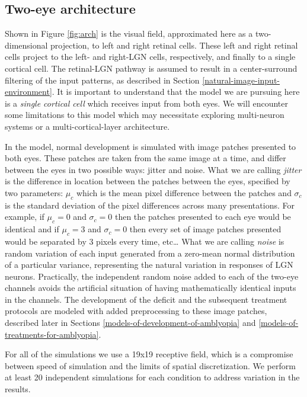 \documentclass[
  sn-apa,
  pdflatex]{sn-jnl}
\theoremstyle{thmstyleone}%
\theoremstyle{thmstyletwo}%
\theoremstyle{thmstylethree}%
\begin{document}
\hypertarget{two-eye-architecture}{%
\subsection{Two-eye architecture}\label{two-eye-architecture}}

Shown in Figure \ref{fig:arch} is the visual field, approximated here as
a two-dimensional projection, to left and right retinal cells. These
left and right retinal cells project to the left- and right-LGN cells,
respectively, and finally to a single cortical cell. The retinal-LGN
pathway is assumed to result in a center-surround filtering of the input
patterns, as described in Section \ref{natural-image-input-environment}.
It is important to understand that the model we are pursuing here is a
\emph{single cortical cell} which receives input from both eyes. We will
encounter some limitations to this model which may necessitate exploring
multi-neuron systems or a multi-cortical-layer architecture.

In the model, normal development is simulated with image patches
presented to both eyes. These patches are taken from the same image at a
time, and differ between the eyes in two possible ways: jitter and
noise. What we are calling \emph{jitter} is the difference in location
between the patches between the eyes, specified by two parameters:
\(\mu_c\) which is the mean pixel difference between the patches and
\(\sigma_c\) is the standard deviation of the pixel differences across
many presentations. For example, if \(\mu_c=0\) and \(\sigma_c=0\) then
the patches presented to each eye would be identical and if \(\mu_c=3\)
and \(\sigma_c=0\) then every set of image patches presented would be
separated by 3 pixels every time, etc\ldots{} What we are calling
\emph{noise} is random variation of each input generated from a
zero-mean normal distribution of a particular variance, representing the
natural variation in responses of LGN neurons. Practically, the
independent random noise added to each of the two-eye channels avoids
the artificial situation of having mathematically identical inputs in
the channels. The development of the deficit and the subsequent
treatment protocols are modeled with added preprocessing to these image
patches, described later in Sections
\ref{models-of-development-of-amblyopia} and
\ref{models-of-treatments-for-amblyopia}.

For all of the simulations we use a 19x19 receptive field, which is a
compromise between speed of simulation and the limits of spatial
discretization. We perform at least 20 independent simulations for each
condition to address variation in the results.
\end{document}
